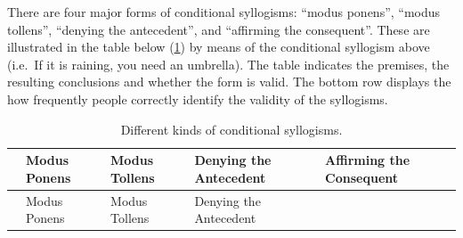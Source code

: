 \documentclass[
]{krantz}
\begin{document}
There are four major forms of conditional syllogisms: ``modus ponens'', ``modus tollens'', ``denying the antecedent'', and ``affirming the consequent''. These are illustrated in the table below (\ref{tab:Syllogisms}) by means of the conditional syllogism above (i.e.~If it is raining, you need an umbrella). The table indicates the premises, the resulting conclusions and whether the form is valid. The bottom row displays the how frequently people correctly identify the validity of the syllogisms.

\begin{longtable}[]{@{}
  >{\raggedright\arraybackslash}p{}
  >{\raggedright\arraybackslash}p{}
  >{\raggedright\arraybackslash}p{}
  >{\raggedright\arraybackslash}p{}
  >{\raggedright\arraybackslash}p{}@{}}
\caption{\label{tab:Syllogisms} Different kinds of conditional syllogisms.}\tabularnewline
\toprule\noalign{}
\begin{minipage}[b]{\linewidth}\raggedright
\end{minipage} & \begin{minipage}[b]{\linewidth}\raggedright
Modus Ponens
\end{minipage} & \begin{minipage}[b]{\linewidth}\raggedright
Modus Tollens
\end{minipage} & \begin{minipage}[b]{\linewidth}\raggedright
Denying the Antecedent
\end{minipage} & \begin{minipage}[b]{\linewidth}\raggedright
Affirming the Consequent
\end{minipage} \\
\midrule\noalign{}
\endfirsthead
\toprule\noalign{}
\begin{minipage}[b]{\linewidth}\raggedright
\end{minipage} & \begin{minipage}[b]{\linewidth}\raggedright
Modus Ponens
\end{minipage} & \begin{minipage}[b]{\linewidth}\raggedright
Modus Tollens
\end{minipage} & \begin{minipage}[b]{\linewidth}\raggedright
Denying the Antecedent
\end{minipage} & \begin{minipage}[b]{\linewidth}\raggedright

\end{minipage}
\end{longtable}
\end{document}
